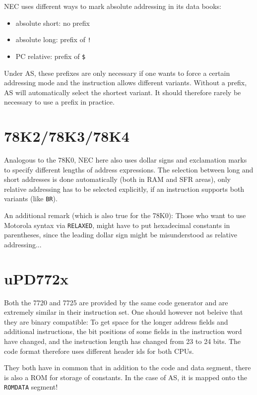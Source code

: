 \documentclass[12pt,twoside]{report}
\newcommand{\tty}[1]{{\tt #1}}
\begin{document}
NEC uses different ways to mark absolute addressing in its data
books:
\begin{itemize}
\item{absolute short: no prefix}
\item{absolute long: prefix of \tty{!}}
\item{PC relative: prefix of \tty{\$}}
\end{itemize}
Under AS, these prefixes are only necessary if one wants to force a
certain addressing mode and the instruction allows different
variants.  Without a prefix, AS will automatically select the shortest
variant.  It should therefore rarely be necessary to use a prefix in
practice.


\section{78K2/78K3/78K4}
\label{78K234Spec}

Analogous to the 78K0, NEC here also uses dollar signs and exclamation
marks to specify different lengths of address expressions.  The selection
between long and short addresses is done automatically (both in RAM and
SFR areas), only relative addressing has to be selected explicitly, if an
instruction supports both variants (like {\tt BR}).

An additional remark (which is also true for the 78K0): Those who want to
use Motorola syntax via {\tt RELAXED}, might have to put hexadecimal
constants in parentheses, since the leading dollar sign might be
misunderstood as relative addressing...


\section{uPD772x}

Both the 7720 and 7725 are provided by the same code generator and are
extremely similar in their instruction set.  One should however not
beleive that they are binary compatible: To get space for the longer
address fields and additional instructions, the bit positions of some
fields in the instruction word have changed, and the instruction length
has changed from 23 to 24 bits.  The code format therefore uses different
header ids for both CPUs.

They both have in common that in addition to the code and data segment,
there is also a ROM for storage of constants.  In the case of AS, it is
mapped onto the \tty{ROMDATA} segment!
\end{document}
